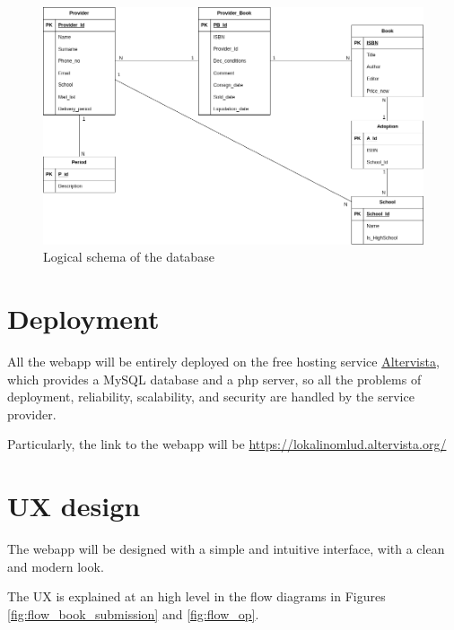 \begin{figure}[h]
    \centering
    \includegraphics[width=\textwidth]{assets/er_diagram.png}
    \caption{Logical schema of the database}
    \label{fig:er}
\end{figure}



\section{Deployment}

All the webapp will be entirely deployed on the free hosting service \href{www.altervista.org}{Altervista}, which provides a MySQL database and a php server, so all the problems of deployment, reliability, scalability, and security are handled by the service provider.

Particularly, the link to the webapp will be \url{https://lokalinomlud.altervista.org/}

\section{UX design}

The webapp will be designed with a simple and intuitive interface, with a clean and modern look.

The UX is explained at an high level in the flow diagrams in Figures \ref{fig:flow_book_submission} and \ref{fig:flow_op}.

